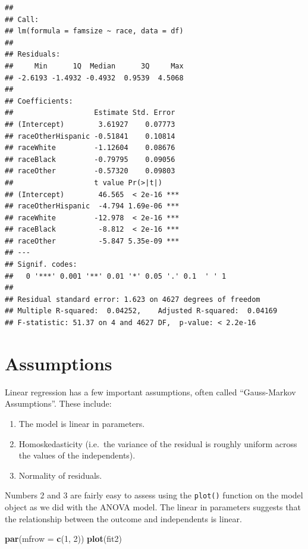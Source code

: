 \documentclass[]{tufte-book}
\newenvironment{Shaded}{}{}
\newcommand{\KeywordTok}[1]{\textcolor[rgb]{0.00,0.44,0.13}{\textbf{#1}}}
\newcommand{\DataTypeTok}[1]{\textcolor[rgb]{0.56,0.13,0.00}{#1}}
\newcommand{\DecValTok}[1]{\textcolor[rgb]{0.25,0.63,0.44}{#1}}
\newcommand{\NormalTok}[1]{#1}
\providecommand{\tightlist}{%
  \setlength{\itemsep}{0pt}\setlength{\parskip}{0pt}}
\theoremstyle{definition}
\theoremstyle{definition}
\theoremstyle{remark}
\begin{document}
\begin{verbatim}
## 
## Call:
## lm(formula = famsize ~ race, data = df)
## 
## Residuals:
##     Min      1Q  Median      3Q     Max 
## -2.6193 -1.4932 -0.4932  0.9539  4.5068 
## 
## Coefficients:
##                   Estimate Std. Error
## (Intercept)        3.61927    0.07773
## raceOtherHispanic -0.51841    0.10814
## raceWhite         -1.12604    0.08676
## raceBlack         -0.79795    0.09056
## raceOther         -0.57320    0.09803
##                   t value Pr(>|t|)    
## (Intercept)        46.565  < 2e-16 ***
## raceOtherHispanic  -4.794 1.69e-06 ***
## raceWhite         -12.978  < 2e-16 ***
## raceBlack          -8.812  < 2e-16 ***
## raceOther          -5.847 5.35e-09 ***
## ---
## Signif. codes:  
##   0 '***' 0.001 '**' 0.01 '*' 0.05 '.' 0.1  ' ' 1
## 
## Residual standard error: 1.623 on 4627 degrees of freedom
## Multiple R-squared:  0.04252,    Adjusted R-squared:  0.04169 
## F-statistic: 51.37 on 4 and 4627 DF,  p-value: < 2.2e-16
\end{verbatim}

\section*{Assumptions}\label{assumptions-1}

Linear regression has a few important assumptions, often called
``Gauss-Markov Assumptions''. These include:

\begin{enumerate}
\def\labelenumi{\arabic{enumi}.}
\tightlist
\item
  The model is linear in parameters.
\item
  Homoskedasticity (i.e.~the variance of the residual is roughly uniform
  across the values of the independents).
\item
  Normality of residuals.
\end{enumerate}

Numbers 2 and 3 are fairly easy to assess using the \texttt{plot()}
function on the model object as we did with the ANOVA model. The linear
in parameters suggests that the relationship between the outcome and
independents is linear.

\begin{Shaded}
\begin{Highlighting}[]
\KeywordTok{par}\NormalTok{(}\DataTypeTok{mfrow =} \KeywordTok{c}\NormalTok{(}\DecValTok{1}\NormalTok{, }\DecValTok{2}\NormalTok{))}
\KeywordTok{plot}\NormalTok{(fit2)}
\end{Highlighting}
\end{Shaded}
\end{document}
